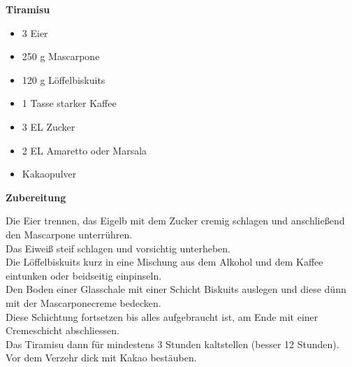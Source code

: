 
\parindent0pt	

\pagestyle{empty}


\textbf{{\LARGE Tiramisu}}%


\hrulefill
\vspace*{\fill}
\begin{multicols}{2}	


\begin{itemize}
\item 3 	Eier
\item 250 g 	Mascarpone
\item 120 g 	Löffelbiskuits
\item 1 Tasse starker Kaffee
\item 3 EL Zucker
\item 2 EL Amaretto oder Marsala
\item Kakaopulver 
\end{itemize}

\end{multicols}
\vfill
\newpage
\textbf{{\LARGE Zubereitung}}%

\hrulefill

\vspace*{\fill}
\begin{multicols}{2}


Die Eier trennen, das Eigelb mit dem Zucker cremig schlagen und anschließend den Mascarpone unterrühren. \\
Das Eiweiß steif schlagen und vorsichtig unterheben.\\
 
Die Löffelbiskuits kurz in eine Mischung aus dem Alkohol und dem Kaffee eintunken oder beidseitig einpinseln.\\

Den Boden einer Glasschale mit einer Schicht Biskuits auslegen und diese dünn mit der Mascarponecreme bedecken.\\
Diese Schichtung fortsetzen bis alles aufgebraucht ist, am Ende mit einer Cremeschicht abschliessen.\\

Das Tiramisu dann für mindestens 3 Stunden kaltstellen (besser 12 Stunden). \\

Vor dem Verzehr dick mit Kakao bestäuben.


\end{multicols}
\vfill
